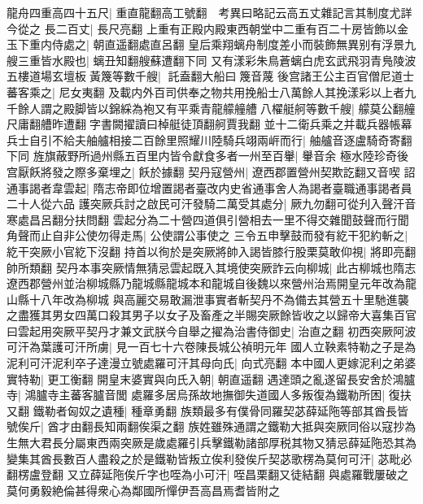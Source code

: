 龍舟四重高四十五尺|{
	重直龍翻高工號翻　考異曰略記云高五丈雜記言其制度尤詳今從之}
長二百丈|{
	長尺亮翻}
上重有正殿内殿東西朝堂中二重有百二十房皆飾以金玉下重内侍處之|{
	朝直遥翻處直呂翻}
皇后乘翔螭舟制度差小而裝飾無異别有浮景九艘三重皆水殿也|{
	螭丑知翻艘蘇遭翻下同}
又有漾彩朱鳥蒼螭白虎玄武飛羽青鳬陵波五樓道場玄壇板黃篾等數千艘|{
	託盍翻大船曰篾音蔑}
後宫諸王公主百官僧尼道士蕃客乘之|{
	尼女夷翻}
及載内外百司供奉之物共用挽船士八萬餘人其挽漾彩以上者九千餘人謂之殿脚皆以錦綵為袍又有平乘青龍艨艟艚八櫂艇舸等數千艘|{
	艨莫公翻艟尺庸翻艚昨遭翻字書闕擢讀曰棹艇徒頂翻舸賈我翻}
並十二衛兵乘之并載兵器帳幕兵士自引不給夫舳艫相接二百餘里照耀川陸騎兵翊兩㟁而行|{
	舳艫音逐盧騎奇寄翻下同}
旌旗蔽野所過州縣五百里内皆令獻食多者一州至百轝|{
	轝音余}
極水陸珍奇後宫厭飫將發之際多棄埋之|{
	飫於據翻}
契丹寇營州|{
	遼西郡置營州契欺訖翻又音喫}
詔通事謁者韋雲起|{
	隋志帝即位增置謁者臺改内史省通事舍人為謁者臺職通事謁者員二十人從六品}
護突厥兵討之啟民可汗發騎二萬受其處分|{
	厥九勿翻可從刋入聲汗音寒處昌呂翻分扶問翻}
雲起分為二十營四道俱引營相去一里不得交雜聞鼓聲而行聞角聲而止自非公使勿得走馬|{
	公使謂公事使之}
三令五申擊鼓而發有紇干犯約斬之|{
	紇干突厥小官紇下沒翻}
持首以徇於是突厥將帥入謁皆膝行股栗莫敢仰視|{
	將即亮翻帥所類翻}
契丹本事突厥情無猜忌雲起既入其境使突厥詐云向柳城|{
	此古柳城也隋志遼西郡營州並治柳城縣乃龍城縣龍城本和龍城自後魏以來營州治焉開皇元年改為龍山縣十八年改為柳城}
與高麗交易敢漏泄事實者斬契丹不為備去其營五十里馳進襲之盡獲其男女四萬口殺其男子以女子及畜產之半賜突厥餘皆收之以歸帝大喜集百官曰雲起用突厥平契丹才兼文武朕今自舉之擢為治書侍御史|{
	治直之翻}
初西突厥阿波可汗為葉護可汗所虜|{
	見一百七十六卷陳長城公禎明元年}
國人立鞅素特勒之子是為泥利可汗泥利卒子達漫立號處羅可汗其母向氏|{
	向式亮翻}
本中國人更嫁泥利之弟婆實特勒|{
	更工衡翻}
開皇末婆實與向氏入朝|{
	朝直遥翻}
遇達頭之亂遂留長安舍於鴻臚寺|{
	鴻臚寺主蕃客臚音閭}
處羅多居烏孫故地撫御失道國人多叛復為鐵勒所困|{
	復扶又翻}
鐵勒者匈奴之遺種|{
	種章勇翻}
族類最多有僕骨同羅契苾薛延陁等部其酋長皆號俟斤|{
	酋才由翻長知兩翻俟渠之翻}
族姓雖殊通謂之鐵勒大抵與突厥同俗以寇抄為生無大君長分屬東西兩突厥是歲處羅引兵擊鐵勒諸部厚税其物又猜忌薛延陁恐其為變集其酋長數百人盡殺之於是鐵勒皆叛立俟利發俟斤契苾歌楞為莫何可汗|{
	苾毗必翻楞盧登翻}
又立薛延陁俟斤字也咥為小可汗|{
	咥昌栗翻又徒結翻}
與處羅戰屢破之莫何勇毅絶倫甚得衆心為鄰國所憚伊吾高昌焉耆皆附之

